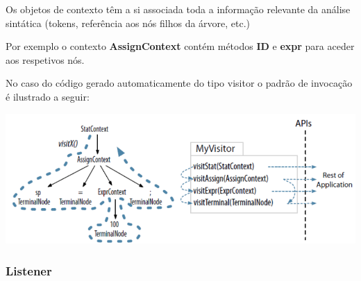 \documentclass{article}
\begin{document}
\begin{flushleft}
  \item Os objetos de contexto têm a si associada toda a
  informação relevante da análise sintática (tokens,
  referência aos nós filhos da árvore, etc.)
  \item Por exemplo o contexto \textbf{AssignContext} contém
  métodos \textbf{ID} e \textbf{expr} para aceder aos respetivos nós.

  \pagebreak
  \item No caso do código gerado automaticamente do tipo visitor
  o padrão de invocação é ilustrado a seguir:

  \begin{center}
    \includegraphics[scale=0.3]{28}
  \end{center}
\end{flushleft}

\subsubsection{Listener}
\end{document}
